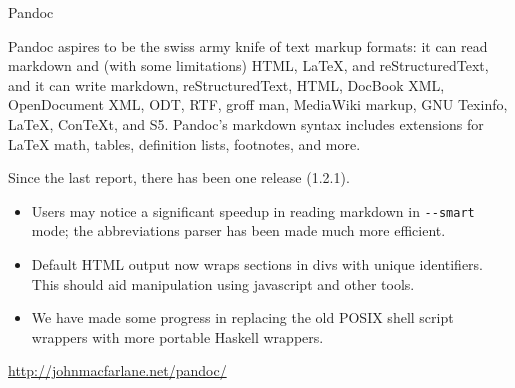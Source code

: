 \begin{hcarentry}[updated]{Pandoc}
\label{pandoc}
\makeheader

Pandoc aspires to be the swiss army knife of text markup formats: it
can read markdown and (with some limitations) HTML, LaTeX, and
reStructuredText, and it can write markdown, reStructuredText, HTML,
DocBook XML, OpenDocument XML, ODT, RTF, groff man, MediaWiki markup,
GNU Texinfo, LaTeX, ConTeXt, and S5.  Pandoc's markdown syntax includes
extensions for LaTeX math, tables, definition lists, footnotes, and more.

Since the last report, there has been one release (1.2.1).
\begin{itemize}
  \item Users may notice a significant speedup in reading markdown in
    \verb!--smart! mode; the abbreviations parser has been made much more
    efficient.
  \item Default HTML output now wraps sections in divs with unique
    identifiers.  This should aid manipulation using javascript and
    other tools.
  \item We have made some progress in replacing the old POSIX shell
    script wrappers with more portable Haskell wrappers.
\end{itemize}

\FurtherReading
    \url{http://johnmacfarlane.net/pandoc/}
\end{hcarentry}
